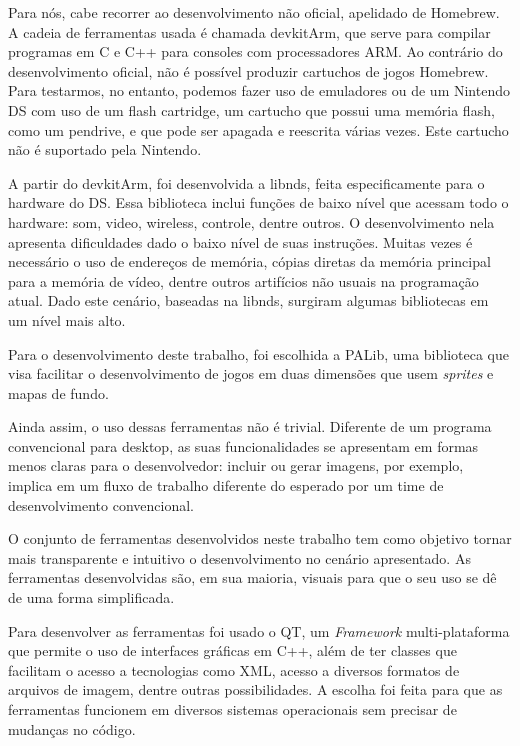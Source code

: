 \documentclass[brazil]{abnt}
\begin{document}
Para nós, cabe recorrer ao desenvolvimento não oficial, apelidado de Homebrew. A cadeia de ferramentas usada é chamada devkitArm, que serve para compilar programas em C e C++ para consoles com processadores ARM. Ao contrário do desenvolvimento oficial, não é possível produzir cartuchos de jogos Homebrew. Para testarmos, no entanto, podemos fazer uso de emuladores ou de um Nintendo DS com uso de um flash cartridge, um cartucho que possui uma memória flash, como um pendrive, e que pode ser apagada e reescrita várias vezes. Este cartucho não é suportado pela Nintendo.

A partir do devkitArm, foi desenvolvida a libnds, feita especificamente para o hardware do DS. Essa biblioteca inclui funções de baixo nível que acessam todo o hardware: som, video, wireless, controle, dentre outros. O desenvolvimento nela apresenta dificuldades dado o baixo nível de suas instruções. Muitas vezes é necessário o uso de endereços de memória, cópias diretas da memória principal para a memória de vídeo, dentre outros artifícios não usuais na programação atual. Dado este cenário, baseadas na libnds, surgiram algumas bibliotecas em um nível mais alto.

Para o desenvolvimento deste trabalho, foi escolhida a PALib, uma biblioteca que visa facilitar o desenvolvimento de jogos em duas dimensões que usem \textit{sprites} e mapas de fundo.

Ainda assim, o uso dessas ferramentas não é trivial. Diferente de um programa convencional para desktop, as suas funcionalidades se apresentam em formas menos claras para o desenvolvedor: incluir ou gerar imagens, por exemplo, implica em um fluxo de trabalho diferente do esperado por um time de desenvolvimento convencional. 

O conjunto de ferramentas desenvolvidos neste trabalho tem como objetivo tornar mais transparente e intuitivo o desenvolvimento no cenário apresentado. As ferramentas desenvolvidas são, em sua maioria, visuais para que o seu uso se dê de uma forma simplificada.


Para desenvolver as ferramentas foi usado o QT, um \textit{Framework} multi-plataforma que permite o uso de interfaces gráficas em C++, além de ter classes que facilitam o acesso a tecnologias como XML, acesso a diversos formatos de arquivos de imagem, dentre outras possibilidades. A escolha foi feita para que as ferramentas funcionem em diversos sistemas operacionais sem precisar de mudanças no código.
\end{document}
